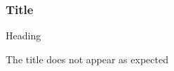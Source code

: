 \documentclass{beamer}
\newenvironment{myframe}[1]
    {\begin{frame}[environment=myframe]
        \frametitle{#1}
        Heading\par
        }
    {\end{frame}}
\begin{document}
\begin{myframe}{Title}
The title does not appear as expected
\end{myframe}
\end{document}

